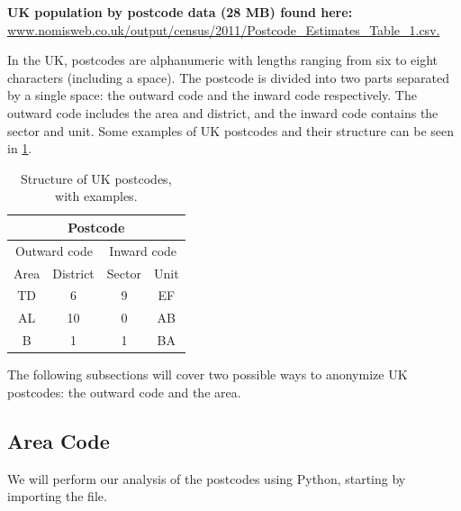 \documentclass{article}
\begin{document}
\textbf{UK population by postcode data (28 MB) found here:} \\ 

\url{www.nomisweb.co.uk/output/census/2011/Postcode_Estimates_Table_1.csv.}

\vspace{\baselineskip}

In the UK, postcodes are alphanumeric with lengths ranging from six to eight characters (including a space). The postcode is divided into two parts separated by a single space: the outward code and the inward code respectively. The outward code includes the area and district, and the inward code contains the sector and unit. Some examples of UK postcodes and their structure can be seen in \cref{tbl:postcode_structure}.

\begin{table}[H]
    \centering
    \caption{Structure of UK postcodes, with examples.}
    \label{tbl:postcode_structure}
    \vspace{0.5\baselineskip}
    \begin{tabular}{|c|c|c|c|}
        \hline
        \multicolumn{4}{|c|}{Postcode}                                        \\ \hline
        \multicolumn{2}{|c|}{Outward code} & \multicolumn{2}{c|}{Inward code} \\ \hline
        Area           & District          & Sector           & Unit          \\ \hline
        TD             & 6                & 9                & EF            \\ \hline
        AL             & 10                & 0                & AB            \\ \hline
        B             & 1                & 1                & BA            \\ \hline
        \end{tabular}
\end{table}

The following subsections will cover two possible ways to anonymize UK postcodes: the outward code and the area.

\subsection{Area Code} \label{sec:area_code}

We will perform our analysis of the postcodes using Python, starting by importing the file.
\end{document}
